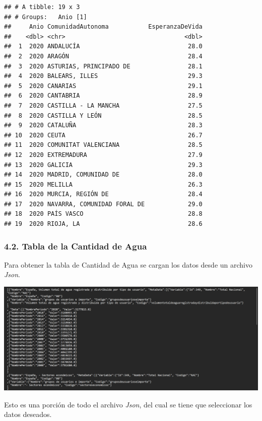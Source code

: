 \documentclass[
]{article}
\begin{document}
\begin{verbatim}
## # A tibble: 19 x 3
## # Groups:   Anio [1]
##     Anio ComunidadAutonoma           EsperanzaDeVida
##    <dbl> <chr>                                 <dbl>
##  1  2020 ANDALUCÍA                              28.0
##  2  2020 ARAGÓN                                 28.4
##  3  2020 ASTURIAS, PRINCIPADO DE                28.1
##  4  2020 BALEARS, ILLES                         29.3
##  5  2020 CANARIAS                               29.1
##  6  2020 CANTABRIA                              28.9
##  7  2020 CASTILLA - LA MANCHA                   27.5
##  8  2020 CASTILLA Y LEÓN                        28.5
##  9  2020 CATALUÑA                               28.3
## 10  2020 CEUTA                                  26.7
## 11  2020 COMUNITAT VALENCIANA                   28.5
## 12  2020 EXTREMADURA                            27.9
## 13  2020 GALICIA                                29.3
## 14  2020 MADRID, COMUNIDAD DE                   28.0
## 15  2020 MELILLA                                26.3
## 16  2020 MURCIA, REGIÓN DE                      28.4
## 17  2020 NAVARRA, COMUNIDAD FORAL DE            29.0
## 18  2020 PAÍS VASCO                             28.8
## 19  2020 RIOJA, LA                              28.6
\end{verbatim}

\hypertarget{tabla-de-la-cantidad-de-agua}{%
\subsubsection{4.2. Tabla de la Cantidad de
Agua}\label{tabla-de-la-cantidad-de-agua}}

Para obtener la tabla de Cantidad de Agua se cargan los datos desde un
archivo \emph{Json}.

\includegraphics{INPUT/images/CantidadAguaJSON.png}

Esto es una porción de todo el archivo \emph{Json}, del cual se tiene
que seleccionar los datos deseados.
\end{document}
